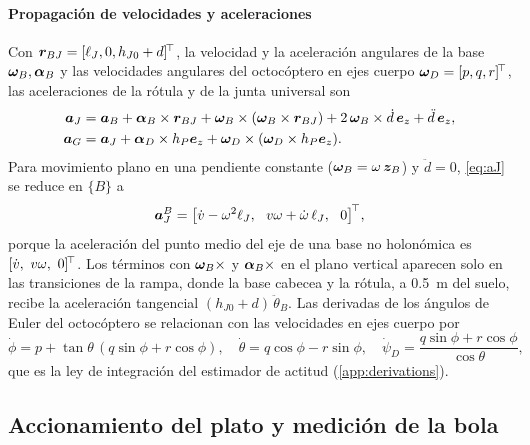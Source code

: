 \paragraph{Propagación de velocidades y aceleraciones}
Con $\bm{r}_{BJ}=[\ell_J,0,h_{J0}+d]^{\!\top}$, la velocidad y la aceleración angulares de la base $\bm{\omega}_B,\bm{\alpha}_B$ y las velocidades angulares del octocóptero en ejes cuerpo $\bm{\omega}_D=[p,q,r]^{\!\top}$, las aceleraciones de la rótula y de la junta universal son
\begin{align}
  \bm{a}_J&=\bm{a}_B+\bm{\alpha}_B\times\bm{r}_{BJ}+\bm{\omega}_B\times(\bm{\omega}_B\times\bm{r}_{BJ})+2\,\bm{\omega}_B\times\dot d\,\bm{e}_z+\ddot d\,\bm{e}_z, \label{eq:aJ}\\
  \bm{a}_G&=\bm{a}_J+\bm{\alpha}_D\times h_P\bm{e}_z+\bm{\omega}_D\times(\bm{\omega}_D\times h_P\bm{e}_z). \label{eq:aG}
\end{align}
Para movimiento plano en una pendiente constante ($\bm{\omega}_B=\omega\,\bm{z}_B$) y $\ddot d=0$, \eqref{eq:aJ} se reduce en $\{B\}$ a
\begin{equation}
  \bm{a}_J^{B}=\big[\dot v-\omega^2\ell_J,\ \ v\omega+\dot\omega\,\ell_J,\ \ 0\big]^{\!\top} ,
  \label{eq:aJplanar}
\end{equation}
porque la aceleración del punto medio del eje de una base no holonómica es $[\dot v,\ v\omega,\ 0]\T$. Los términos con $\bm{\omega}_B\times$ y $\bm{\alpha}_B\times$ en el plano vertical aparecen solo en las transiciones de la rampa, donde la base cabecea y la rótula, a \SI{0.5}{\metre} del suelo, recibe la aceleración tangencial $(h_{J0}+d)\,\ddot\theta_B$. Las derivadas de los ángulos de Euler del octocóptero se relacionan con las velocidades en ejes cuerpo por
\begin{equation}
  \dot\phi=p+\tan\theta\,(q\sin\phi+r\cos\phi),\quad \dot\theta=q\cos\phi-r\sin\phi,\quad \dot\psi_D=\frac{q\sin\phi+r\cos\phi}{\cos\theta},
  \label{eq:euler_rates}
\end{equation}
que es la ley de integración del estimador de actitud (\ref{app:derivations}).

\subsection{Accionamiento del plato y medición de la bola}
\label{sec:linkage}

